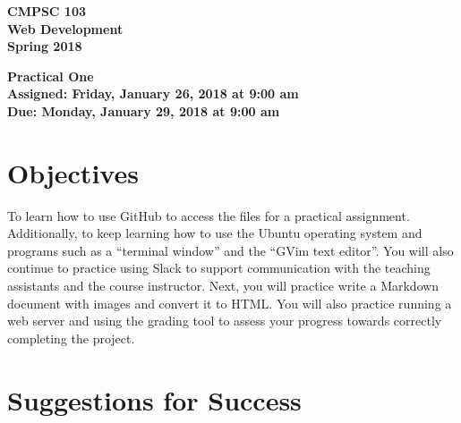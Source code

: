 \documentclass[11pt]{article}
\newcommand{\assignmentduedate}{January 29}
\newcommand{\assignmentassignedate}{January 26}
\newcommand{\assignmentnumber}{One}
\newcommand{\labyear}{2018}
\newcommand{\labdueday}{Monday}
\newcommand{\labassignday}{Friday}
\newcommand{\labtime}{9:00 am}
\newcommand{\assigneddate}{Assigned: \labassignday, \assignmentassignedate, \labyear{} at \labtime{}}
\newcommand{\duedate}{Due: \labdueday, \assignmentduedate, \labyear{} at \labtime{}}
\newcommand{\labtitle}[1]
{
  \begin{center}
    \begin{center}
      \bf
      CMPSC 103\\Web Development\\
      Spring 2018\\
      \medskip
    \end{center}
    \bf
    #1
  \end{center}
}
\begin{document}
\thispagestyle{empty}

\labtitle{Practical \assignmentnumber{} \\ \assigneddate{} \\ \duedate{}}

\section*{Objectives}

To learn how to use GitHub to access the files for a practical assignment. Additionally, to keep learning how to use the
Ubuntu operating system and programs such as a ``terminal window'' and the ``GVim text editor''. You will also continue
to practice using Slack to support communication with the teaching assistants and the course instructor. Next, you will
practice write a Markdown document with images and convert it to HTML. You will also practice running a web server and
using the grading tool to assess your progress towards correctly completing the project.

\section*{Suggestions for Success}
\end{document}
